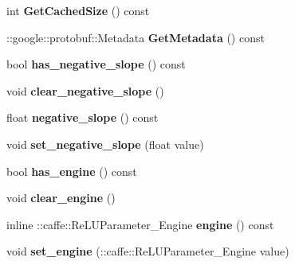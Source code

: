 \begin{DoxyCompactItemize}
int {\bfseries Get\+Cached\+Size} () const
\item 
\mbox{\label{classcaffe_1_1_re_l_u_parameter_a566b8b13de9f9df651a22bb884b8097d}} 
\+::google\+::protobuf\+::\+Metadata {\bfseries Get\+Metadata} () const
\item 
\mbox{\label{classcaffe_1_1_re_l_u_parameter_aab97fa54fb5612aac71e783ff50fb45d}} 
bool {\bfseries has\+\_\+negative\+\_\+slope} () const
\item 
\mbox{\label{classcaffe_1_1_re_l_u_parameter_a61bcb0fe079237105af54eb543a0c786}} 
void {\bfseries clear\+\_\+negative\+\_\+slope} ()
\item 
\mbox{\label{classcaffe_1_1_re_l_u_parameter_a564297ba27a5412fbf069275ff2eec85}} 
float {\bfseries negative\+\_\+slope} () const
\item 
\mbox{\label{classcaffe_1_1_re_l_u_parameter_a45ad9a4d3dbee43fafa3c50b8b48d5bf}} 
void {\bfseries set\+\_\+negative\+\_\+slope} (float value)
\item 
\mbox{\label{classcaffe_1_1_re_l_u_parameter_aad85d4495f66ec22de53568db5a08214}} 
bool {\bfseries has\+\_\+engine} () const
\item 
\mbox{\label{classcaffe_1_1_re_l_u_parameter_a0bc017b4b720aed05f4147f647defeca}} 
void {\bfseries clear\+\_\+engine} ()
\item 
\mbox{\label{classcaffe_1_1_re_l_u_parameter_afaf4e86a0c4bad27aaedfea4995a9cb0}} 
inline \+::caffe\+::\+Re\+L\+U\+Parameter\+\_\+\+Engine {\bfseries engine} () const
\item 
\mbox{\label{classcaffe_1_1_re_l_u_parameter_a33f9a29e54ecc782ab172c8eaaccf55d}} 
void {\bfseries set\+\_\+engine} (\+::caffe\+::\+Re\+L\+U\+Parameter\+\_\+\+Engine value)
\item 
\mbox{\label{classcaffe_1_1_re_l_u_parameter_ae4cd0b5879fa1105272c1dcc80bd22ba}} 

\end{DoxyCompactItemize}
